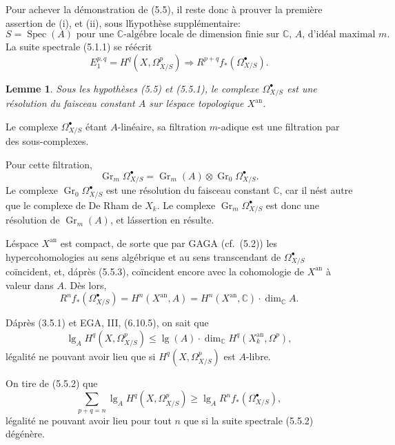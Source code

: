 \documentclass[12pt]{amsart}
\theoremstyle{plain}
\newtheorem{lem}[prop]{Lemme}
\theoremstyle{remark}
\DeclareMathOperator{\Spec}{Spec}
\DeclareMathOperator{\Gr}{Gr}
\DeclareMathOperator{\lgB}{lg}
\begin{document}
Pour achever la d\'emonstration de (5.5), il reste donc \`a prouver la premi\`ere assertion de (i), et (ii), sous l\'hypoth\`ese suppl\'ementaire:
\begin{equation}\label{eq:5.5.1}
S = \Spec(A) \text{ pour une $\mathbb{C}$-alg\'ebre locale de dimension finie sur $\mathbb{C}$, $A$, d'id\'eal maximal $m$.}
\end{equation}
La suite spectrale (5.1.1) se r\'e\'ecrit
\begin{equation}\label{eq:5.5.2}
E_1^{p,q} = H^q(X, \Omega_{X/S}^p) \Rightarrow R^{p+q} f_* (\Omega_{X/S}^\bullet).
\end{equation}

\begin{lem}\label{lem:5.5.3}
Sous les hypoth\`eses (5.5) et (5.5.1), le complexe $\Omega_{X/S}^\bullet$ est une r\'esolution du faisceau constant $A$ sur l\'espace topologique $X^{\text{an}}$.
\end{lem}

Le complexe $\Omega_{X/S}^\bullet$ \'etant $A$-lin\'eaire, sa filtration $m$-adique est une filtration par des sous-complexes.

Pour cette filtration,
\[
\Gr_m \Omega_{X/S}^\bullet = \Gr_m(A) \otimes \Gr_0 \Omega_{X/S}^\bullet.
\]
Le complexe $\Gr_0 \Omega_{X/S}^\bullet$ est une r\'esolution du faisceau constant $\mathbb{C}$, car il n\'est autre que le complexe de De Rham de $X_k$. Le complexe $\Gr_m \Omega_{X/S}^\bullet$ est donc une r\'esolution de $\Gr_m(A)$, et l\'assertion en r\'esulte.

L\'espace $X^{\text{an}}$ est compact, de sorte que par GAGA (cf.~(5.2)) les hypercohomologies au sens alg\'ebrique et au sens transcendant de $\Omega_{X/S}^\bullet$ co\"incident, et, d\'apr\`es (5.5.3), co\"incident encore avec la cohomologie de $X^{\text{an}}$ \`a valeur dans $A$. D\`es lors,
\begin{equation}\label{eq:5.5.4}
R^n f_* (\Omega_{X/S}^\bullet) = H^n(X^{\text{an}}, A) = H^n(X^{\text{an}}, \mathbb{C}) \cdot \dim_\mathbb{C} A.
\end{equation}

D\'apr\`es (3.5.1) et EGA, III, (6.10.5), on sait que
\begin{equation}\label{eq:5.5.5}
\lgB_A H^q(X, \Omega_{X/S}^p) \leq \lgB(A) \cdot \dim_\mathbb{C} H^q(X_k^{\text{an}}, \Omega^p),
\end{equation}
l\'egalit\'e ne pouvant avoir lieu que si $H^q(X, \Omega_{X/S}^p)$ est $A$-libre.

On tire de (5.5.2) que
\begin{equation}\label{eq:5.5.6}
\sum_{p+q=n} \lgB_A H^q(X, \Omega_{X/S}^p) \geq \lgB_A R^n f_* (\Omega_{X/S}^\bullet),
\end{equation}
l\'egalit\'e ne pouvant avoir lieu pour tout $n$ que si la suite spectrale (5.5.2) d\'eg\'en\`ere.
\end{document}
